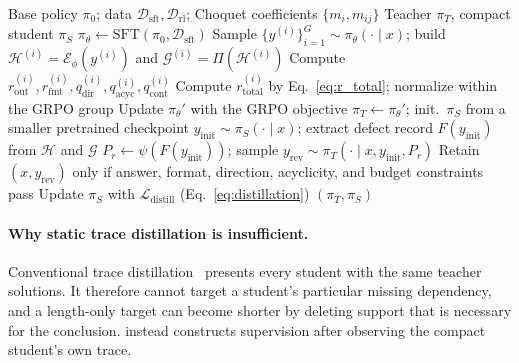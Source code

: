 

\begin{algorithm}[t]
\small
\caption{\framework Training Pipeline}
\label{alg:topoprm}
\begin{algorithmic}[1]
\Require Base policy $\pi_0$; data $\mathcal{D}_{\mathrm{sft}},\mathcal{D}_{\mathrm{rl}}$; Choquet coefficients $\{m_i,m_{ij}\}$
\Ensure Teacher $\pi_T$, compact student $\pi_S$
\State $\pi_\theta\!\leftarrow\!\mathrm{SFT}(\pi_0,\mathcal{D}_{\mathrm{sft}})$ 
 
  \State Sample $\{y^{(i)}\}_{i=1}^{G}\!\sim\!\pi_\theta(\cdot\!\mid\!x)$; build $\mathcal{H}^{(i)}\!=\!\mathcal{E}_{\phi}(y^{(i)})$ and $\mathcal{G}^{(i)}\!=\!\Pi(\mathcal{H}^{(i)})$
  \State Compute $r_{\mathrm{out}}^{(i)},r_{\mathrm{fmt}}^{(i)},q_{\mathrm{dir}}^{(i)},q_{\mathrm{acyc}}^{(i)},q_{\mathrm{cont}}^{(i)}$
  \State Compute $r_{\mathrm{total}}^{(i)}$ by Eq.~\ref{eq:r_total}; normalize within the GRPO group
  \State Update $\pi_\theta'$ with the GRPO objective
\EndFor
\State $\pi_T\!\leftarrow\!\pi_\theta'$; init.\ $\pi_S$ from a smaller pretrained checkpoint
 
  \State $y_{\mathrm{init}}\!\sim\!\pi_S(\cdot\!\mid\!x)$; extract defect record $F(y_{\mathrm{init}})$ from $\mathcal{H}$ and $\mathcal{G}$
  \State $P_r\!\leftarrow\!\psi(F(y_{\mathrm{init}}))$; sample $y_{\mathrm{rev}}\!\sim\!\pi_T(\cdot\!\mid\!x,y_{\mathrm{init}},P_r)$
  \State Retain $(x,y_{\mathrm{rev}})$ only if answer, format, direction, acyclicity, and budget constraints pass
  \State Update $\pi_S$ with $\mathcal{L}_{\mathrm{distill}}$ (Eq.~\ref{eq:distillation})
\EndFor
\State \Return $(\pi_T,\pi_S)$
\end{algorithmic}
\end{algorithm}

\paragraph{Why static trace distillation is insufficient.}
Conventional trace distillation~\citep{hinton2015distilling,minillm2023} presents every student with the same teacher solutions. It therefore cannot target a student's particular missing dependency, and a length-only target can become shorter by deleting support that is necessary for the conclusion. \framework instead constructs supervision after observing the compact student's own trace.

